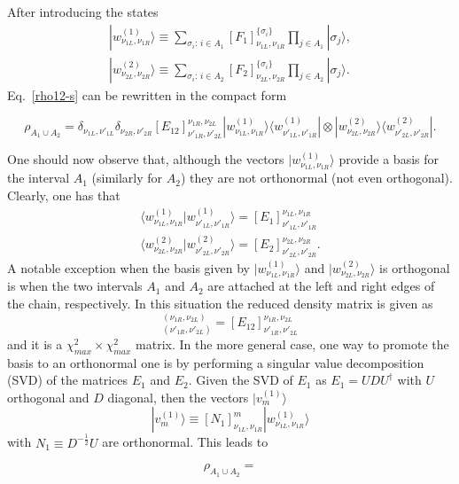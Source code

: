 \documentclass[twocolumn,superscriptaddress,prb,10pt]{revtex4-1}
\begin{document}
After introducing the states
%
\begin{align}
|w^{(1)}_{\nu_{1L},\nu_{1R}}\rangle\equiv\sum\limits_{\sigma_i:\,i\in A_1}
[F_1]^{\{\sigma_i\}}_{\nu_{1L},\nu_{1R}}\prod\limits_{j\in A_1}|\sigma_j\rangle,\\
|w^{(2)}_{\nu_{2L},\nu_{2R}}\rangle\equiv\sum\limits_{\sigma_i:\,i\in A_2}
[F_2]^{\{\sigma_i\}}_{\nu_{2L},\nu_{2R}}\prod\limits_{j\in A_2}|\sigma_j\rangle.
\end{align}
%
Eq.~\eqref{rho12-s} can be rewritten in the compact form  
%
\begin{widetext}
\begin{equation}
\rho_{A_1\cup A_2}=\delta_{\nu_{1L},\nu'_{1L}}\delta_{\nu_{2R},\nu'_{2R}}
[E_{12}]^{\nu_{1R},\nu_{2L}}_{\nu'_{1R},\nu'_{2L}}|w^{(1)}_{\nu_{1L},\nu_{1R}}
\rangle\langle w^{(1)}_{\nu'_{1L},\nu'_{1R}}|\otimes |w^{(2)}_{\nu_{2L},\nu_{2R}}
\rangle\langle w^{(2)}_{\nu'_{2L},\nu'_{2R}}|.
\end{equation}
\end{widetext}
%
One should now observe that, although the vectors $|w^{(1)}_{\nu_{1L},\nu_{1R}}
\rangle$ provide a basis for the interval $A_1$ (similarly for $A_2$) they are 
not orthonormal (not even orthogonal). Clearly, one has that 
%
\begin{align}
\langle w^{(1)}_{\nu_{1L},\nu_{1R}}|w^{(1)}_{\nu'_{1L},\nu'_{1R}}\rangle=
[E_1]^{\nu_{1L},\nu_{1R}}_{\nu'_{1L},\nu'_{1R}} \\
\langle w^{(2)}_{\nu_{2L},\nu_{2R}}|w^{(2)}_{\nu'_{2L},\nu'_{2R}}\rangle=
[E_2]^{\nu_{2L},\nu_{2R}}_{\nu'_{2L},\nu'_{2R}}. 
\end{align}
%  
A notable exception when the basis given by $|w^{(1)}_{\nu_{1L},\nu_{1R}}\rangle$ 
and $|w^{(2)}_{\nu_{2L},\nu_{2R}}\rangle$ is orthogonal is when the two intervals 
$A_1$ and $A_2$ are attached at the left and right edges of the chain, respectively. 
In this situation the reduced density matrix is given as 
%
\begin{equation}
[\rho_{A_1\cup A_2}]^{(\nu_{1R},\nu_{2L})}_{(\nu'_{1R},\nu'_{2L})}=
[E_{12}]^{\nu_{1R},\nu_{2L}}_{\nu'_{1R},\nu'_{2L}}
\end{equation}
%
and it is a $\chi^2_{max}\times\chi^2_{max}$ matrix. 
In the more general case, one way to promote the basis to an orthonormal one is 
by performing a singular value decomposition (SVD) of the matrices $E_1$ and $E_2$. 
Given the SVD of $E_1$ as $E_1=UDU^\dagger$ with $U$ orthogonal and $D$ diagonal, 
then the vectors $|v^{(1)}_m\rangle$ 
%
\begin{equation}
|v^{(1)}_{m}\rangle\equiv [N_1]^m_{\nu_{1L},\nu_{1R}}|w^{(1)}_{\nu_{1L},\nu_{1R}}\rangle
\end{equation}
%
with $N_1\equiv D^{-\frac{1}{2}}U$ are orthonormal. This leads to 
%
\begin{widetext}
\begin{equation}
\rho_{A_1\cup A_2}=
\end{equation}
\end{widetext}
%
\end{document}
